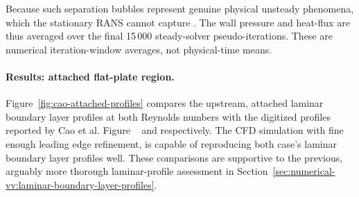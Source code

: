 Because such separation bubbles represent genuine physical unsteady phenomena, which the stationary RANS cannot capture \cite{chiapparino2023numerical}. The wall pressure and heat-flux are thus averaged over the final 15\,000 steady-solver pseudo-iterations. These are numerical iteration-window averages, not physical-time means. 


\paragraph{Results: attached flat-plate region.}

Figure~\ref{fig:cao-attached-profiles} compares the upstream, attached laminar boundary layer profiles at both Reynolds numbers with the digitized profiles reported by Cao et al. Figure ~\citep[Fig.~7(a)]{Cao2022TransitionIntrinsicInstability} and \citet[Fig.~2(b)]{Cao2021UnsteadyEffects} respectively. The CFD simulation with fine enough leading edge refinement, is capable of reproducing both case's laminar boundary layer profiles well. These comparisons are supportive to the previous, arguably more thorough laminar-profile assessment in Section~\ref{sec:numerical-vv:laminar-boundary-layer-profiles}.

